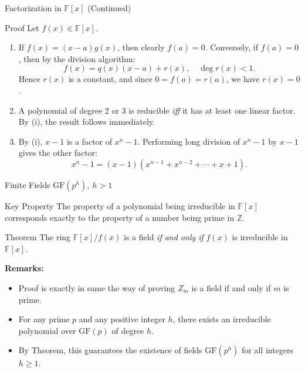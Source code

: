 \documentclass[aspectratio=169,xcolor=dvipsnames]{beamer}
\begin{document}
	\begin{frame}{Factorization in $\mathbb{F}[x]$ (Continued)}
		
		\begin{alertblock}{Proof}
			Let $f(x) \in \mathbb{F}[x]$.
			\begin{enumerate}
				\item[(i)] If $f(x) = (x-a)g(x)$, then clearly $f(a) = 0$.
				Conversely, if $f(a) = 0$, then by the division algorithm:
				\[
				f(x) = q(x)(x-a) + r(x), \quad \deg r(x) < 1.
				\]
				Hence $r(x)$ is a constant, and since $0 = f(a) = r(a)$, we have $r(x) = 0$.
				
				\item[(ii)] A polynomial of degree 2 or 3 is reducible \emph{iff} it has at least one linear factor.
				By (i), the result follows immediately.
				
				\item[(iii)] By (i), $x-1$ is a factor of $x^n - 1$.
				Performing long division of $x^n - 1$ by $x-1$ gives the other factor:
				\[
				x^n - 1 = (x-1)(x^{n-1} + x^{n-2} + \cdots + x + 1).
				\]
			\end{enumerate}
		\end{alertblock}
		
	\end{frame}
	
	\begin{frame}{Finite Fields $\mathrm{GF}(p^h),\ h>1$}
		
		\begin{alertblock}{Key Property}
			The property of a polynomial being irreducible in $\mathbb{F}[x]$ corresponds exactly to the property of a number being prime in $\mathbb{Z}$.
		\end{alertblock}
		
		\begin{block}{Theorem}
			The ring $\mathbb{F}[x]/f(x)$ is a field \emph{if and only if} $f(x)$ is irreducible in $\mathbb{F}[x]$.
		\end{block}
		
		\textbf{Remarks:}
		\begin{itemize}
			\item Proof is exactly in same the way of proving $Z_m$ is a field if and only if $m$ is prime.
			\item For any prime $p$ and any positive integer $h$, there exists an irreducible polynomial over $\mathrm{GF}(p)$ of degree $h$.
			\item By Theorem, this guarantees the existence of fields $\mathrm{GF}(p^h)$ for all integers $h \ge 1$.
		\end{itemize}
		
	\end{frame}
	
\end{document}
